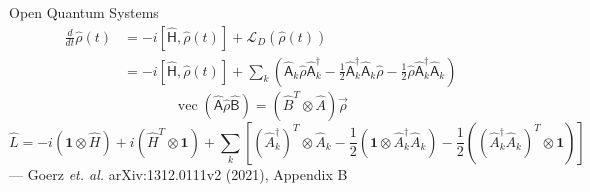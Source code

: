 \documentclass[compress, aspectratio=169]{beamer}
\newcommand{\identity}[0]{\mathbf{1}}
\newcommand{\Op}[1]{\ensuremath{\mathsf{\hat{#1}}}}
\def\mat#1{\hat{#1}}
\def\half{ \frac{1}{2}}
\newcommand{\vectorize}{\operatorname{vec}}
\begin{document}
\appendix
\backupbegin

\begin{frame}
\end{frame}

\begin{frame}{Open Quantum Systems}
  \begin{align*}
  \frac{d}{dt}\Op{\rho}(t)
      & =-i\left[\Op{H},\Op{\rho}(t)\right]+\mathcal{L}_{D}(\Op{\rho}(t))\\
      & =-i\left[\Op{H},\Op{\rho}(t)\right]+\sum_{k}\left(\Op{A}_{k}\Op{\rho}\Op{A}_{k}^{\dagger}-\frac{1}{2}\Op{A}_{k}^{\dagger}\Op{A}_{k}\Op{\rho}-\frac{1}{2}\Op{\rho}\Op{A}_{k}^{\dagger}\Op{A}_{k}\right)
  \end{align*}
  \begin{equation*}
    \vectorize\left(\Op{A} \Op{\rho} \Op{B} \right)
    = \left(\mat{B}^{T} \otimes \mat{A}\right) \vec{\rho}
  \end{equation*}
  \begin{equation*}
    \mat{L} =
      -i (\identity \otimes \mat{H}) + i (\mat{H}^T \otimes \identity)
      + \sum_k \left[
        (\mat{A}_k^\dagger)^T \otimes \mat{A}_k
        - \half \left(\identity \otimes \mat{A}_k^\dagger \mat{A}_k\right)
        - \half \left((\mat{A}_k^\dagger \mat{A}_k)^T \otimes \identity\right)
        \right]\
  \end{equation*}
  \hfill {\footnotesize --- Goerz \textit{et. al.} arXiv:1312.0111v2 (2021), Appendix B}
\end{frame}

\backupend
\end{document}
